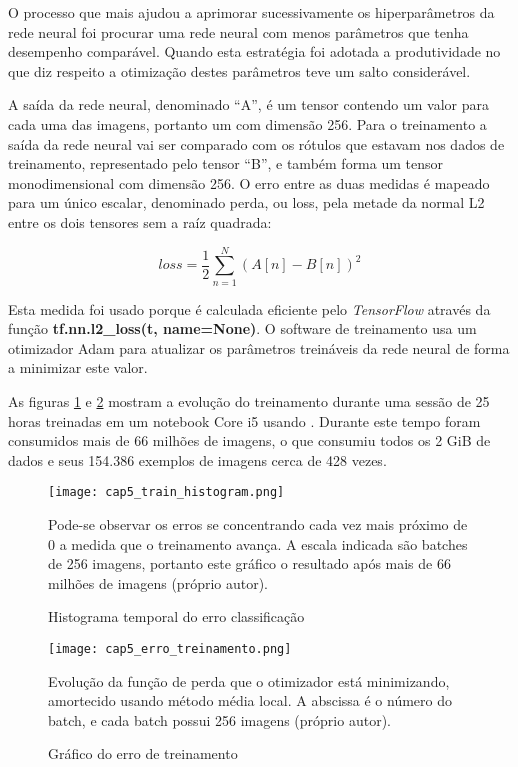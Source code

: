 O processo que mais ajudou a aprimorar sucessivamente os hiperparâmetros da
rede neural foi procurar uma rede neural com menos parâmetros que tenha
desempenho comparável. Quando esta estratégia foi adotada a produtividade no
que diz respeito a otimização destes parâmetros teve um salto considerável.

A saída da rede neural, denominado “A”, é um tensor contendo um valor para cada
uma das imagens, portanto um com dimensão 256. Para o treinamento a saída da
rede neural vai ser comparado com os rótulos que estavam nos dados de
treinamento, representado pelo tensor “B”, e também forma um tensor
monodimensional com dimensão 256. O erro entre as duas medidas é mapeado para
um único escalar, denominado perda, ou loss, pela metade da normal L2 entre os
dois tensores sem a raíz quadrada:

\begin{equation}
	loss=\frac{1}{2} \sum_{n=1}^N \left( A[n] - B[n] \right)^2
\end{equation}

Esta medida foi usado porque é calculada eficiente pelo \emph{TensorFlow}
através da função \textbf{tf.nn.l2\_loss(t, name=None)}. O software de
treinamento usa um otimizador
Adam \cite{kingma2014adam} para atualizar os parâmetros treináveis da rede
neural de forma a minimizar este valor.

As figuras \ref{fig:cap5_train_histogram} e \ref{fig:cap5_erro_treinamento}
mostram a evolução do treinamento durante uma sessão de 25
horas treinadas em um notebook Core i5 usando . Durante este tempo foram
consumidos mais de 66 milhões de imagens, o que consumiu todos os 2 GiB de
dados e seus 154.386 exemplos de imagens cerca de 428 vezes.

\begin{figure}[!htb]
	\centering
	\texttt{[image: cap5\_train\_histogram.png]}
	\caption{Histograma temporal do erro classificação}
	\label{fig:cap5_train_histogram}
	Pode-se observar os erros se concentrando cada vez mais próximo de 0 a
	medida que o treinamento avança. A escala indicada são batches de 256
	imagens, portanto este gráfico o resultado após mais de 66 milhões de
	imagens (próprio autor).
\end{figure}

\begin{figure}[!htb]
	\centering
	\texttt{[image: cap5\_erro\_treinamento.png]}
	\caption{Gráfico do erro de treinamento}
	\label{fig:cap5_erro_treinamento}
	Evolução da função de perda que o otimizador está minimizando, amortecido
	usando método média local. A abscissa é o número do batch, e cada batch
	possui 256 imagens (próprio autor).
\end{figure}

